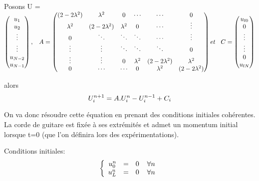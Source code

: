 Posons U = 
\begin{math}
\begin{pmatrix}
u_{1}\\
u_{2}\\
\vdots \\
\vdots \\
u_{N-2}\\
u_{N-1}
\end{pmatrix}
, \hspace{3 mm} A = 
\begin{pmatrix}
(2-2\lambda ^2) & \lambda ^2 & 0 & \cdots & \cdots & 0\\
\lambda ^2 & (2-2\lambda ^2) & \lambda ^2 & 0 & \cdots & \vdots\\
0 & \ddots & \ddots & \ddots & \cdots & \vdots\\
\vdots & \vdots & \ddots & \ddots & \ddots & 0\\
\vdots & \vdots & 0 &\lambda ^2 & (2-2\lambda ^2) & \lambda ^2 \\
0 & \cdots & \cdots & 0 & \lambda ^2 & (2-2\lambda ^2)
\end{pmatrix}
et \hspace{3 mm} C = 
\begin{pmatrix}
u_{l0}\\
0\\
\vdots \\
\vdots \\
0\\
u_{lN}
\end{pmatrix}
\end{math}

\vspace*{7 mm}
alors\\

\begin{equation*}
U^{n+1}_i = A.U^{n}_i - U^{n-1}_i + C_i\\
\end{equation*}

On va donc résoudre cette équation en prenant des conditions initiales cohérentes. La corde de guitare est fixée à ses extrémités et admet un momentum initial lorsque t=0 (que l'on définira lors des expérimentations).

Conditions initiales: 
\begin{equation*}
\left \{
\begin{array}{rcl}
u^{n}_{0}& = & 0 \hspace*{4 mm} \forall n\\
u^{n}_{L}& = &0 \hspace*{4 mm} \forall n\\
\end{array}
\right.
\end{equation*}

